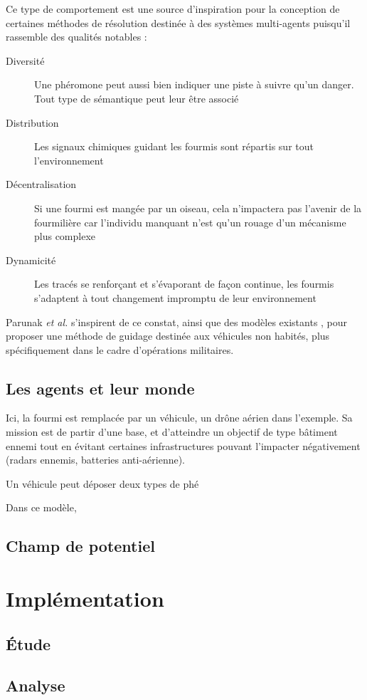 \documentclass[12pt]{article}
\begin{document}
Ce type de comportement est une source d'inspiration pour la
conception de certaines méthodes de résolution destinée à des systèmes
multi-agents puisqu'il rassemble des qualités notables
\cite{parunak} :

\begin{description}
\item[Diversité]{Une phéromone peut aussi bien indiquer une piste à suivre qu'un danger. Tout type de sémantique peut leur être associé}
  \item[Distribution]{Les signaux chimiques guidant les fourmis sont répartis
sur tout l'environnement}
  \item[Décentralisation]{Si une fourmi est mangée par un oiseau, cela
  n'impactera pas l'avenir de la fourmilière car l'individu manquant
  n'est qu'un rouage d'un mécanisme plus complexe}
  \item[Dynamicité]{Les tracés se renforçant et s'évaporant de façon continue, les fourmis
s'adaptent à tout changement impromptu de leur environnement}
\end{description}

Parunak \textit{et al.} s'inspirent de ce constat, ainsi que des
modèles existants \cite{dorigo}, pour proposer une méthode de guidage
destinée aux véhicules non habités, plus spécifiquement dans le cadre
d'opérations militaires.

\subsection{Les agents et leur monde}

Ici, la fourmi est remplacée par un véhicule, un drône aérien dans l'exemple. Sa mission
est de partir d'une base, et d'atteindre un objectif de type bâtiment ennemi tout en évitant
certaines infrastructures pouvant l'impacter négativement (radars ennemis, batteries anti-aérienne).

Un véhicule peut déposer deux types de phé

Dans ce modèle, 

\subsection{Champ de potentiel}



\section{Implémentation}

\subsection{\'Etude}

\subsection{Analyse}



\end{document}
